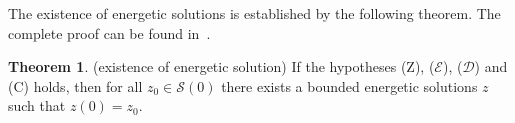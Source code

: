 \documentclass[a4paper,10pt,oneside]{amsbook}
\numberwithin{section}{chapter}
\numberwithin{equation}{chapter}
\theoremstyle{definition}
\newtheorem{thm}[prop]{Theorem}
\DeclareMathOperator{\argmin}{argmin}
\begin{document}
The existence of energetic solutions is established by the following theorem. The complete proof can be found in~\cite{francfort}.
\begin{thm}(existence of energetic solution)
\label{thm:existence-energetic-solutions}
If the hypotheses (Z), ($\mathcal{E}$), ($\mathcal{D}$) and (C) holds, then for all $z_0\in\mathscr{S}(0)$ there exists a bounded energetic solutions $z$ such that $z(0)=z_0$.
\end{thm}
%
%
\end{document}
